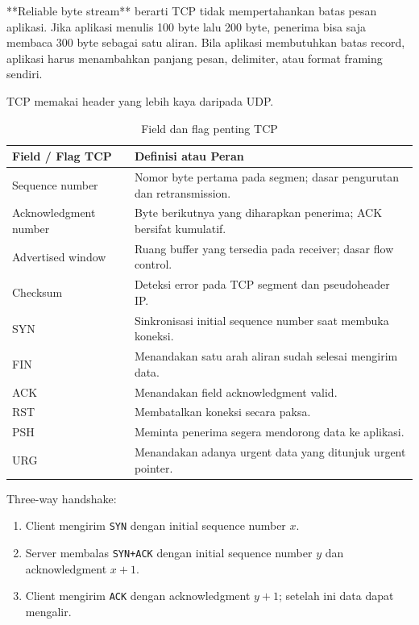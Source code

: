 **Reliable byte stream** berarti TCP tidak mempertahankan batas pesan aplikasi. Jika aplikasi menulis 100 byte lalu 200 byte, penerima bisa saja membaca 300 byte sebagai satu aliran. Bila aplikasi membutuhkan batas record, aplikasi harus menambahkan panjang pesan, delimiter, atau format framing sendiri.

TCP memakai header yang lebih kaya daripada UDP.

\begin{table}[H]
\centering
\begin{tabularx}{\textwidth}{|L{0.28\textwidth}|X|}
\hline
\textbf{Field / Flag TCP} & \textbf{Definisi atau Peran} \\
\hline
Sequence number & Nomor byte pertama pada segmen; dasar pengurutan dan retransmission. \\
\hline
Acknowledgment number & Byte berikutnya yang diharapkan penerima; ACK bersifat kumulatif. \\
\hline
Advertised window & Ruang buffer yang tersedia pada receiver; dasar flow control. \\
\hline
Checksum & Deteksi error pada TCP segment dan pseudoheader IP. \\
\hline
SYN & Sinkronisasi initial sequence number saat membuka koneksi. \\
\hline
FIN & Menandakan satu arah aliran sudah selesai mengirim data. \\
\hline
ACK & Menandakan field acknowledgment valid. \\
\hline
RST & Membatalkan koneksi secara paksa. \\
\hline
PSH & Meminta penerima segera mendorong data ke aplikasi. \\
\hline
URG & Menandakan adanya urgent data yang ditunjuk urgent pointer. \\
\hline
\end{tabularx}
\caption{Field dan flag penting TCP}
\label{tab:tcp-field-flag}
\end{table}

Three-way handshake:
\begin{enumerate}
    \item Client mengirim \texttt{SYN} dengan initial sequence number $x$.
    \item Server membalas \texttt{SYN+ACK} dengan initial sequence number $y$ dan acknowledgment $x+1$.
    \item Client mengirim \texttt{ACK} dengan acknowledgment $y+1$; setelah ini data dapat mengalir.
\end{enumerate}

